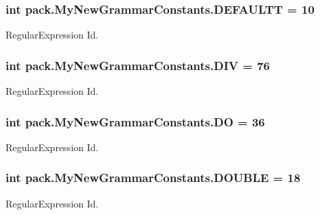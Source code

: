 \subsubsection[{\texorpdfstring{D\+E\+F\+A\+U\+L\+TT}{DEFAULTT}}]{\setlength{\rightskip}{0pt plus 5cm}int pack.\+My\+New\+Grammar\+Constants.\+D\+E\+F\+A\+U\+L\+TT = 10}\hypertarget{interfacepack_1_1_my_new_grammar_constants_a4edce04fff88e25d214e22f8b8e2621f}{}\label{interfacepack_1_1_my_new_grammar_constants_a4edce04fff88e25d214e22f8b8e2621f}
Regular\+Expression Id. 
\subsubsection[{\texorpdfstring{D\+IV}{DIV}}]{\setlength{\rightskip}{0pt plus 5cm}int pack.\+My\+New\+Grammar\+Constants.\+D\+IV = 76}\hypertarget{interfacepack_1_1_my_new_grammar_constants_afe95748c6a40662c60d18b94517c372a}{}\label{interfacepack_1_1_my_new_grammar_constants_afe95748c6a40662c60d18b94517c372a}
Regular\+Expression Id. 
\subsubsection[{\texorpdfstring{DO}{DO}}]{\setlength{\rightskip}{0pt plus 5cm}int pack.\+My\+New\+Grammar\+Constants.\+DO = 36}\hypertarget{interfacepack_1_1_my_new_grammar_constants_a3168699f17a1d1788629891abadf3d7b}{}\label{interfacepack_1_1_my_new_grammar_constants_a3168699f17a1d1788629891abadf3d7b}
Regular\+Expression Id. 
\subsubsection[{\texorpdfstring{D\+O\+U\+B\+LE}{DOUBLE}}]{\setlength{\rightskip}{0pt plus 5cm}int pack.\+My\+New\+Grammar\+Constants.\+D\+O\+U\+B\+LE = 18}\hypertarget{interfacepack_1_1_my_new_grammar_constants_a14f9e19101a714beed8dbe4220f1e320}{}\label{interfacepack_1_1_my_new_grammar_constants_a14f9e19101a714beed8dbe4220f1e320}
Regular\+Expression Id. 
